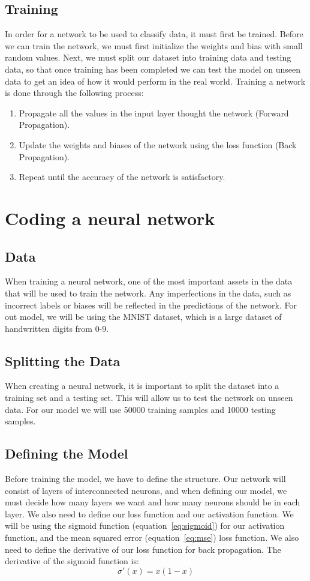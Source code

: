 \documentclass[a1,portrait]{a1poster}
\begin{document}
\begin{multicols}{2}
\subsection*{Training}
In order for a network to be used to classify data, it must first be trained. Before we can train the network, we must first initialize the weights and bias with small random values. Next, we must split our dataset into training data and testing data, so that once training has been completed we can test the model on unseen data to get an idea of how it would perform in the real world.  Training a network is done through the following process:
\begin{enumerate}
    \item Propagate all the values in the input layer thought the network (Forward Propagation).
    \item Update the weights and biases of the network using the loss function (Back Propagation).
    \item Repeat until the accuracy of the network is satisfactory.  
\end{enumerate}

\section*{Coding a neural network}
\subsection*{Data}
When training a neural network, one of the most important assets in the data that will be used to train the network. Any imperfections in the data, such as incorrect labels or biases will be reflected in the predictions of the network. For out model, we will be using the MNIST dataset, which is a large dataset of handwritten digits from 0-9.

\subsection*{Splitting the Data}
When creating a neural network, it is important to split the dataset into a training set and a testing set. This will allow us to test the network on unseen data. For our model we will use 50000 training samples and 10000 testing samples.

\subsection*{Defining the Model}
Before training the model, we have to define the structure. Our network will consist of layers of interconnected neurons, and when defining our model, we must decide how many layers we want and how many neurons should be in each layer. We also need to define our loss function and our activation function. We will be using the sigmoid function (equation~\ref{eq:sigmoid}) for our activation function, and the mean squared error (equation~\ref{eq:mse}) loss function. We also need to define the derivative of our loss function for back propagation. The derivative of the sigmoid function is:
\begin{equation}
    \sigma'(x) = x(1-x)
    \label{eq:sigmoid-prime}
\end{equation}

\end{multicols}
\end{document}
